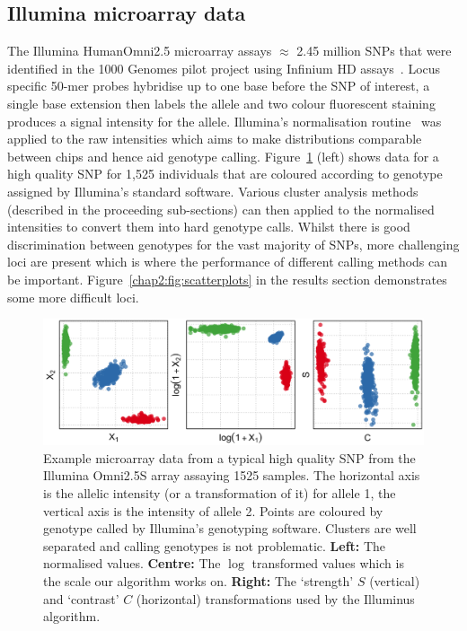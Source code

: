 \subsection{Illumina microarray data}
The Illumina HumanOmni2.5 microarray assays $\approx$ 2.45 million SNPs that were identified in the 1000 Genomes pilot project using Infinium HD assays~\citep{Steemers2006}.  Locus specific 50-mer probes hybridise up to one base before the SNP of interest, a single base extension then labels the allele and two colour fluorescent staining produces a signal intensity for the allele.  Illumina's normalisation routine~\citep{kermani2006artificial} was applied to the raw intensities which aims to make distributions comparable between chips and hence aid genotype calling.  Figure~\ref{chap2:easysnp} (left) shows data for a high quality SNP for 1,525 individuals that are coloured according to genotype assigned by Illumina's standard software.   Various cluster analysis methods (described in the proceeding sub-sections) can then applied to the normalised intensities to convert them into hard genotype calls. Whilst there is good discrimination between genotypes for the vast majority of SNPs, more challenging loci are present which is where the performance of different calling methods can be important. Figure~\ref{chap2:fig:scatterplots} in the results section demonstrates some more difficult loci.


\begin{figure}
  \begin{center} \includegraphics[width=\textwidth]{chap2figs/snpexample_1}
    \caption[Example microarray data from a typical high quality SNP]{Example microarray data from a typical high quality SNP from the Illumina Omni2.5S array assaying 1525 samples. The horizontal axis is the allelic intensity (or a transformation of it) for allele 1, the vertical axis is the intensity of allele 2.  Points are coloured by genotype called by Illumina's genotyping software.  Clusters are well separated and calling genotypes is not problematic. \textbf{Left:} The normalised values. \textbf{Centre:} The $\log$ transformed values which is the scale our algorithm works on. \textbf{Right:} The `strength' $S$ (vertical) and `contrast' $C$ (horizontal) transformations used by the Illuminus algorithm.}
\label{chap2:easysnp}
  \end{center} 
\end{figure}

